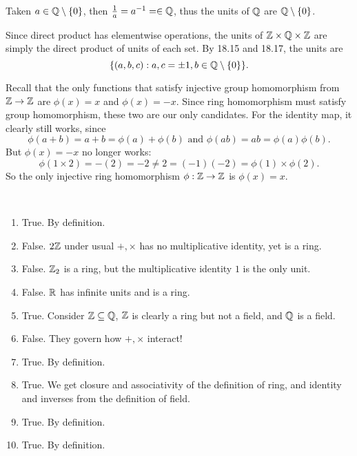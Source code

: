 \documentclass[12pt]{article}
\begin{document}
\begin{problem}[18.17]
	Taken $ a \in \mathbb{Q} \setminus \{0\}$, then $ \frac{1}{a} = a^{-1}= \in \mathbb{Q}$,  thus the units of $ \mathbb{Q}$ are $ \mathbb{Q} \setminus \{0\}$.
\end{problem}
\begin{problem}[18.18]
Since direct product has elementwise operations, the units of $ \mathbb{Z}\times \mathbb{Q}\times \mathbb{Z}$ are simply the direct product of units of each set. By 18.15 and 18.17, the units are 
\[
	\{(a,b,c): a,c = \pm 1, b \in \mathbb{Q}\setminus \{0\}\}   
.\] 
\end{problem}
\begin{problem}[18.23]
	Recall that the only functions that satisfy injective group homomorphism from $ \mathbb{Z} \to \mathbb{Z}$ are $ \phi(x)=x$ and $ \phi(x)=-x$. Since ring homomorphism must satisfy group homomorphism, these two are our only candidates. For the identity map, it clearly still works, since
	\[
		\phi(a+b) = a+b = \phi(a)+\phi(b) \text{ and } \phi(ab)=ab=\phi(a)\phi(b) 
	.\] 
	But $ \phi(x)=-x$ no longer works:
	\[
		\phi(1 \times 2)=-(2)=-2\neq 2 =(-1)(-2) = \phi(1)\times \phi(2) 
	.\]
	So the only injective ring homomorphism $ \phi: \mathbb{Z} \to \mathbb{Z}$ is $ \phi(x)=x$.
\end{problem}
\begin{problem}[18.33]
~\begin{enumerate}[label=\alph*)]
	\item True. By definition.
	\item False. $ 2\mathbb{Z}$ under usual $ +,\times $ has no multiplicative identity, yet is a ring.
	\item False. $ \mathbb{Z}_2 $ is a ring, but the multiplicative identity $ 1$ is the only unit.
	\item False.  $ \mathbb{R}$ has infinite units and is a ring.
	\item True. Consider $ \mathbb{Z} \subseteq \mathbb{Q}$, $ \mathbb{Z}$ is clearly a ring but not a field, and $ \mathbb{Q}$ is a field.
	\item False. They govern how $ +,\times $ interact!
	\item True. By definition.
	\item True. We get closure and associativity of the definition of ring, and identity and inverses from the definition of field.
	\item True. By definition.
	\item True. By definition.

\end{enumerate}
\end{problem}
\end{document}
